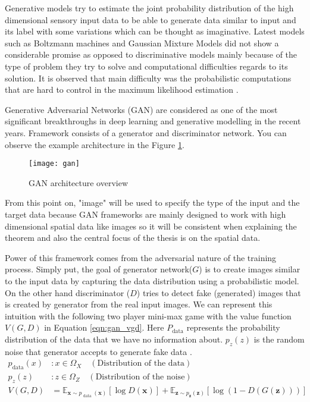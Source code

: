 Generative models try to estimate the joint probability distribution of the high dimensional sensory 
input data to be able to generate data similar to input and its label with some variations which can be 
thought as imaginative. Latest models such as Boltzmann machines \cite{Salakhutdinov2009DeepBM} and Gaussian Mixture Models 
\cite{Reynolds2009GaussianMM} did not show a considerable promise as opposed to discriminative models mainly 
because of the type of problem they try to solve and computational difficulties regards to its solution. 
It is observed that main difficulty was the probabilistic computations that are hard to control in the maximum 
likelihood estimation \cite{Goodfellow:2014:GAN:2969033.2969125,pmlr-v5-salakhutdinov09a}.

Generative Adversarial Networks (GAN)\cite{Goodfellow:2014:GAN:2969033.2969125} are considered as one of 
the most significant breakthroughs in deep learning and generative modelling in the recent years. Framework 
consists of a generator and discriminator network. You can observe the example architecture in the Figure 
\ref{fig:gan_network}. 

\begin{figure}[h]
	\centering
	\texttt{[image: gan]}
    \caption{GAN architecture overview}
    \label{fig:gan_network}
\end{figure}

From this point on, "image" will be used to specify the type of the input and the target data because
GAN frameworks are mainly designed to work with high dimensional spatial data like images so it will
be consistent when explaining the theorem and also the central focus of the thesis is on the spatial
data. 

Power of this framework comes from the adversarial nature of the training process. Simply put,
the goal of generator network($G$) is to create images similar to the input data by capturing the
data distribution using a probabilistic model. On the other hand discriminator ($D$) tries to detect fake
(generated) images that is created by generator from the real input images. We can represent this intuition 
with the following two player mini-max game with the value function $V(G,D)$ in Equation \ref{eqn:gan_vgd}. 
Here $P_{\text{data}}$ represents the probability distribution of the data that we have no information about. 
$p_z(z)$ is the random noise that generator accepts to generate fake data 
\cite{Goodfellow:2014:GAN:2969033.2969125}.
\begin{align}
    p_{\text{data}} (x) & : x \in \Omega_{X} \quad (\text{Distribution of the data})\\[5pt]
    p_z (z) & : z \in \Omega_{Z} \quad (\text{Distribution of the noise}) \\[5pt]
    \label{eqn:gan_vgd}
    V(G, D) &= \mathbb{E}_{\boldsymbol{x} \sim p_{\text { data }}(\boldsymbol{x})}[\log D(\boldsymbol{x})]+\mathbb{E}_{\boldsymbol{z} \sim p_{\boldsymbol{z}}(\boldsymbol{z})}[\log (1-D(G(\boldsymbol{z})))]
\end{align}

